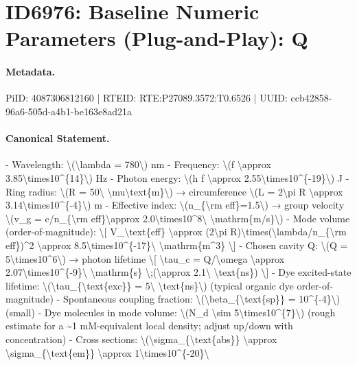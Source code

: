 \section*{ID6976: Baseline Numeric Parameters (Plug-and-Play): Q}
\paragraph{Metadata.}
PiID: 4087306812160 | RTEID: RTE:P27089.3572:T0.6526 | UUID: ccb42858-96a6-505d-a4b1-be163e8ad21a

\paragraph{Canonical Statement.}
- Wavelength: \textbackslash{}(\textbackslash{}lambda = 780\textbackslash{}) nm - Frequency: \textbackslash{}(f \textbackslash{}approx 3.85\textbackslash{}times10\textasciicircum{}\{14\}\textbackslash{}) Hz - Photon energy: \textbackslash{}(h f \textbackslash{}approx 2.55\textbackslash{}times10\textasciicircum{}\{-19\}\textbackslash{}) J - Ring radius: \textbackslash{}(R = 50\textbackslash{} \textbackslash{}mu\textbackslash{}text\{m\}\textbackslash{}) → circumference \textbackslash{}(L = 2\textbackslash{}pi R \textbackslash{}approx 3.14\textbackslash{}times10\textasciicircum{}\{-4\}\textbackslash{}) m - Effective index: \textbackslash{}(n\_\{\textbackslash{}rm eff\}=1.5\textbackslash{}) → group velocity \textbackslash{}(v\_g = c/n\_\{\textbackslash{}rm eff\}\textbackslash{}approx 2.0\textbackslash{}times10\textasciicircum{}8\textbackslash{} \textbackslash{}mathrm\{m/s\}\textbackslash{}) - Mode volume (order-of-magnitude): \textbackslash{}[ V\_\textbackslash{}text\{eff\} \textbackslash{}approx (2\textbackslash{}pi R)\textbackslash{}times(\textbackslash{}lambda/n\_\{\textbackslash{}rm eff\})\textasciicircum{}2 \textbackslash{}approx 8.5\textbackslash{}times10\textasciicircum{}\{-17\}\textbackslash{} \textbackslash{}mathrm\{m\textasciicircum{}3\} \textbackslash{}] - Chosen cavity Q: \textbackslash{}(Q = 5\textbackslash{}times10\textasciicircum{}6\textbackslash{}) → photon lifetime \textbackslash{}[ \textbackslash{}tau\_c = Q/\textbackslash{}omega \textbackslash{}approx 2.07\textbackslash{}times10\textasciicircum{}\{-9\}\textbackslash{} \textbackslash{}mathrm\{s\} \textbackslash{};(\textbackslash{}approx 2.1\textbackslash{} \textbackslash{}text\{ns\}) \textbackslash{}] - Dye excited-state lifetime: \textbackslash{}(\textbackslash{}tau\_\{\textbackslash{}text\{exc\}\} = 5\textbackslash{} \textbackslash{}text\{ns\}\textbackslash{}) (typical organic dye order-of-magnitude) - Spontaneous coupling fraction: \textbackslash{}(\textbackslash{}beta\_\{\textbackslash{}text\{sp\}\} = 10\textasciicircum{}\{-4\}\textbackslash{}) (small) - Dye molecules in mode volume: \textbackslash{}(N\_d \textbackslash{}sim 5\textbackslash{}times10\textasciicircum{}\{7\}\textbackslash{}) (rough estimate for a \textasciitilde{}1 mM-equivalent local density; adjust up/down with concentration) - Cross sections: \textbackslash{}(\textbackslash{}sigma\_\{\textbackslash{}text\{abs\}\} \textbackslash{}approx \textbackslash{}sigma\_\{\textbackslash{}text\{em\}\} \textbackslash{}approx 1\textbackslash{}times10\textasciicircum{}\{-20\}\textbackslash{} 